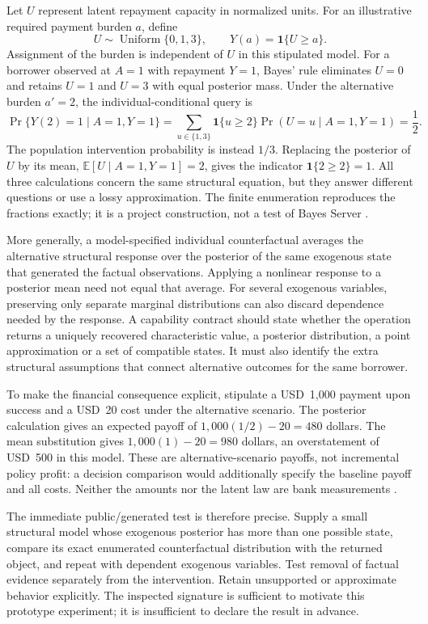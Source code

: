 Let $U$ represent latent repayment capacity in normalized units. For an
illustrative required payment burden $a$, define
\[
 U\sim\operatorname{Uniform}\{0,1,3\},\qquad
 Y(a)=\mathbf 1\{U\geq a\}.
\]
Assignment of the burden is independent of $U$ in this stipulated model.
For a borrower observed at $A=1$ with repayment $Y=1$, Bayes' rule eliminates
$U=0$ and retains $U=1$ and $U=3$ with equal posterior mass. Under the
alternative burden $a'=2$, the individual-conditional query is
\[
 \Pr\{Y(2)=1\mid A=1,Y=1\}
 =\sum_{u\in\{1,3\}}\mathbf 1\{u\geq2\}
   \Pr(U=u\mid A=1,Y=1)=\frac12.
\]
The population intervention probability is instead $1/3$. Replacing the
posterior of $U$ by its mean, $\mathbb E[U\mid A=1,Y=1]=2$, gives the
indicator $\mathbf 1\{2\geq2\}=1$. All three calculations concern the
same structural equation, but they answer different questions or use a lossy
approximation. The finite enumeration reproduces the fractions exactly; it
is a project construction, not a test of Bayes Server
\citep{exec14_ci_exact}.

More generally, a model-specified individual counterfactual averages the
alternative structural response over the posterior of the same exogenous
state that generated the factual observations. Applying a nonlinear response
to a posterior mean need not equal that average. For several exogenous
variables, preserving only separate marginal distributions can also discard
dependence needed by the response. A capability contract should state whether
the operation returns a uniquely recovered characteristic value, a posterior
distribution, a point approximation or a set of compatible states. It must
also identify the extra structural assumptions that connect alternative
outcomes for the same borrower.

To make the financial consequence explicit, stipulate a USD~1,000 payment
upon success and a USD~20 cost under the alternative scenario. The posterior
calculation gives an expected payoff of $1{,}000(1/2)-20=480$ dollars. The
mean substitution gives $1{,}000(1)-20=980$ dollars, an overstatement of
USD~500 in this model. These are alternative-scenario payoffs, not incremental
policy profit: a decision comparison would additionally specify the baseline
payoff and all costs. Neither the amounts nor the latent law are bank
measurements \citep{exec14_ci_exact}.

The immediate public/generated test is therefore precise. Supply a small
structural model whose exogenous posterior has more than one possible state,
compare its exact enumerated counterfactual distribution with the returned
object, and repeat with dependent exogenous variables. Test removal of factual
evidence separately from the intervention. Retain unsupported or approximate
behavior explicitly. The inspected signature is sufficient to motivate this
prototype experiment; it is insufficient to declare the result in advance.

